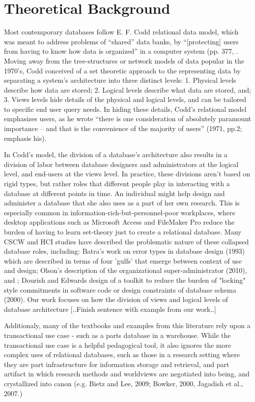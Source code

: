 \section{Theoretical Background}
Most contemporary databases follow E. F. Codd relational data model, which was meant to address problems of “shared” data banks, by  “[protecting] users from having to know how data is organized” in a computer system (pp. 377, \cite{Codd_1970}. Moving away from the tree-structures or network models of data popular in the 1970's, Codd conceived of a set theoretic approach to the representing data by separating a system's architecture into three distinct levels: 1. Physical levels describe how data are stored; 2. Logical levels describe what data are stored, and; 3. Views levels hide details of the physical and logical levels, and can be tailored to specific end user query needs. In hiding these details, Codd's relational model emphasizes users, as he wrote “there is one consideration of absolutely paramount importance – and that is the convenience of the majority of users” (1971, pp.2; emphasis his). 

In Codd's  model, the division of a database's architecture also results in a division of labor between database designers and administrators at the logical level, and end-users at the views level. In practice, these divisions aren't based on rigid types, but rather roles that different people play in interacting with a database at different points in time. An individual might help design and administer a database that she also uses as a part of her own research. This is especially common in information-rich-but-personnel-poor workplaces, where desktop applications such as Microsoft Access and FileMaker Pro reduce the burden of having to learn set-theory just to create a relational database. Many CSCW and HCI studies have described the problematic nature of these collapsed database roles, including: Batra's work on error types in database design (1993) which are described in terms of  four 'gulfs' that emerge between context of use and design; Olson's description of the organizational super-administrator (2010), and ; Dourish and Edwards design of a toolkit to reduce the burden of "locking" style commitments in software code or design constraints of database schema (2000). Our work focuses on how the division of views and logical levels of database architecture [..Finish sentence with example from our work..] 

Additionaly, many of the textbooks and examples from this literature rely upon a transactional use case - such as a parts database in a warehouse. While the transactional use case is a helpful pedagogical tool, it also  ignores the more complex uses of relational databases, such as those in a research setting where they are part infrastructure for information storage and retrieval, and part artifact in which research methods and worldviews are negotiated into being, and crystallized into canon (e.g. Bietz and Lee, 2009; Bowker, 2000, Jagadish et al., 2007.)  


